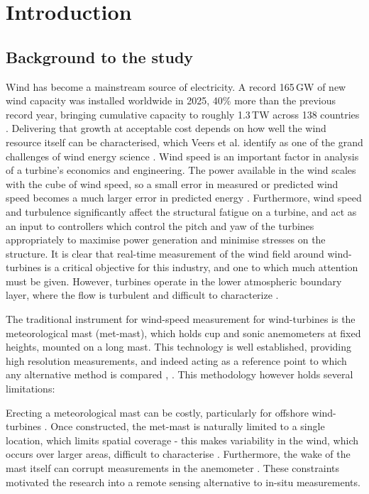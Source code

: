 \chapter{Introduction}

\section{Background to the study}
Wind has become a mainstream source of electricity. A record 165\,GW of
new wind capacity was installed worldwide in 2025, 40\% more than the
previous record year, bringing cumulative capacity to roughly 1.3\,TW
across 138 countries \cite{gwec2026}. Delivering that growth at acceptable cost depends on how well the wind
resource itself can be characterised, which Veers et al. identify as one
of the grand challenges of wind energy science \cite{veers_grand_2019}.
Wind speed is an important factor in analysis of a turbine's economics
and engineering. The power available in the wind scales with the cube of
wind speed, so a small error in measured or predicted wind speed becomes
a much larger error in predicted energy \cite{windenergyhandbook}. Furthermore, wind speed and turbulence significantly affect the structural fatigue on a turbine, and act as an input to controllers which control the pitch and yaw of the turbines appropriately to maximise power generation and minimise stresses on the structure. It is clear that real-time measurement of the wind field around wind-turbines is a critical objective for this industry, and one to which much attention must be given. However, turbines operate in the lower atmospheric boundary layer, where the flow
is turbulent and difficult to characterize \cite{letizia_characterization_2023}.

The traditional instrument for wind-speed measurement for wind-turbines is the meteorological mast (met-mast),
which holds cup and sonic anemometers at fixed heights, mounted on a long mast. This technology is well established, providing high resolution measurements, and indeed acting as a reference point to which any alternative method is compared \cite{liu_review_2019}, \cite{hill_remote_nodate}. This methodology however holds several limitations:

Erecting a meteorological mast can be costly, particularly for offshore wind-turbines \cite{wagner_uncertainty_2016}. Once constructed, the  met-mast is naturally limited to a single location, which limits spatial coverage - this makes variability in the wind, which occurs over larger areas, difficult to characterise \cite{letizia_characterization_2023}. Furthermore, the wake of the mast itself can corrupt measurements in the anemometer \cite{letizia_characterization_2023}. These constraints motivated the research into a remote sensing alternative to in-situ measurements.

